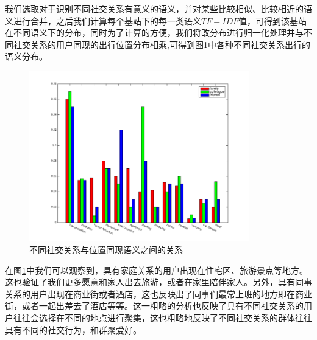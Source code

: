 我们选取对于识别不同社交关系有意义的语义，并对某些比较相似、比较相近的语义进行合并，之后我们计算每个基站下的每一类语义$TF-IDF$值，可得到该基站在不同语义下的分布，同时为了计算的方便，我们将改分布进行归一化处理并与不同社交关系的用户同现的出行位置分布相乘,可得到图\ref{fig-spatial-context}中各种不同社交关系出行的语义分布。



\begin{figure}[!ht]
    \centering
    \includegraphics[scale=1, width=0.85\textwidth]{figure/contextDistribution.png}
    \caption{不同社交关系与位置同现语义之间的关系}
    \label{fig-spatial-context}
\end{figure}


在图\ref{fig-spatial-context}中我们可以观察到，具有家庭关系的用户出现在住宅区、旅游景点等地方。这也验证了我们更多愿意和家人出去旅游，或者在家里陪伴家人。另外，具有同事关系的用户出现在商业街或者酒店，这也反映出了同事们最常上班的地方即在商业街，或者一起出差去了酒店等等。这一粗略的分析也反映了具有不同社交关系的用户往往会选择在不同的地点进行聚集，这也粗略地反映了不同社交关系的群体往往具有不同的社交行为，和群聚爱好。
















